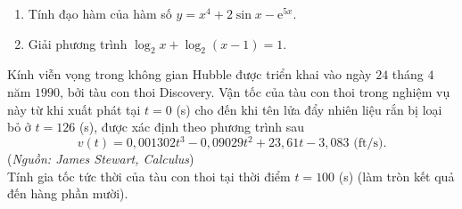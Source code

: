 \begin{bt}%
	\begin{enumerate}
		\item Tính đạo hàm của hàm số $y=x^4+2\sin x - \mathrm{e}^{5x}$.
		\item Giải phương trình $\log_2x+\log_2(x-1)=1$.
	\end{enumerate}
	
\end{bt}

\begin{ex}%
	Kính viễn vọng trong không gian Hubble được triển khai vào ngày $24$ tháng $4$ năm $1990$, bởi tàu con thoi Discovery. Vận tốc của tàu con thoi trong nghiệm vụ này từ khi xuất phát tại $t=0$ (s) cho đến khi tên lửa đẩy nhiên liệu rắn bị loại bỏ ở $t=126$ (s), được xác định theo phương trình sau
	$$v(t)=0{,}001302 t^3-0{,}09029 t^2+23{,}61 t-3{,}083\text{ (ft/s)}.$$
	(\textit{Nguồn: James Stewart, Calculus})\\
	Tính gia tốc tức  thời của tàu con thoi tại thời điểm $t=100$ (s) (làm tròn kết quả đến hàng phần mười).
\end{ex}

